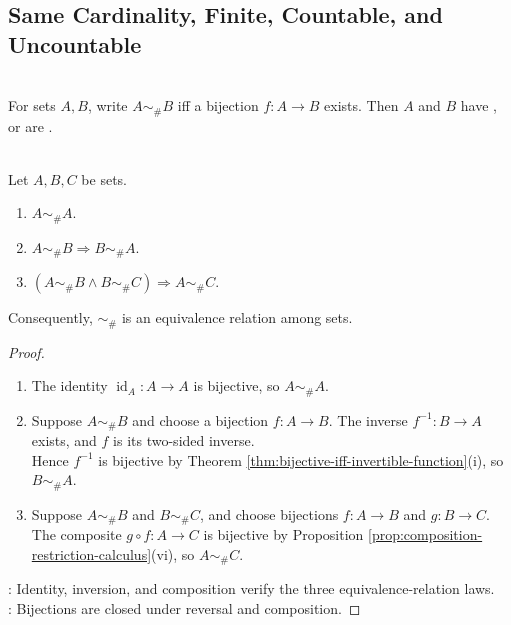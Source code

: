 \subsection{Same Cardinality, Finite, Countable, and Uncountable}

\begin{definition} \label{def:cardinality-equivalence} \\
For sets $A,B$, write $A\sim_{\#}B$ iff a bijection $f:A\to B$ exists. Then $A$ and $B$ have , or are .
\end{definition}

\begin{proposition} \label{prop:cardinality-equivalence-relation} \\
Let $A,B,C$ be sets.
\begin{enumerate}[label=(\roman*)]
\setlength{\itemsep}{0pt}
\item $A\sim_{\#}A$.
\item $A\sim_{\#}B\Rightarrow B\sim_{\#}A$.
\item $(A\sim_{\#}B\land B\sim_{\#}C)\Rightarrow A\sim_{\#}C$.
\end{enumerate}
Consequently, $\sim_{\#}$ is an equivalence relation among sets.
\begin{proof}
\begin{enumerate}[label=(\roman*)]
\setlength{\itemsep}{0pt}
\item The identity $\operatorname{id}_A:A\to A$ is bijective, so $A\sim_{\#}A$.
\item Suppose $A\sim_{\#}B$ and choose a bijection $f:A\to B$. The inverse $f^{-1}:B\to A$ exists, and $f$ is its two-sided inverse.\\
Hence $f^{-1}$ is bijective by Theorem \ref{thm:bijective-iff-invertible-function}(i), so $B\sim_{\#}A$.
\item Suppose $A\sim_{\#}B$ and $B\sim_{\#}C$, and choose bijections $f:A\to B$ and $g:B\to C$.\\
The composite $g\circ f:A\to C$ is bijective by Proposition \ref{prop:composition-restriction-calculus}(vi), so $A\sim_{\#}C$.
\end{enumerate}
: Identity, inversion, and composition verify the three equivalence-relation laws.\\
: Bijections are closed under reversal and composition.
\end{proof}
\end{proposition}

